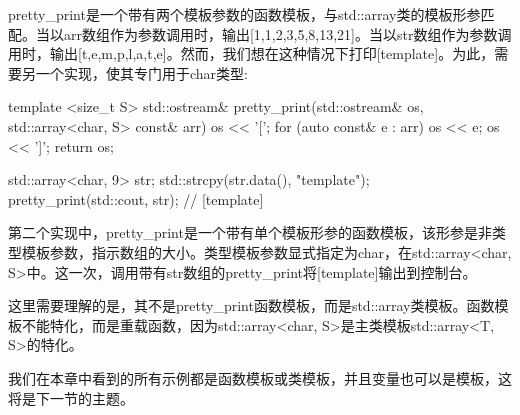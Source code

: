 pretty\_print是一个带有两个模板参数的函数模板，与std::array类的模板形参匹配。当以arr数组作为参数调用时，输出[1,1,2,3,5,8,13,21]。当以str数组作为参数调用时，输出[t,e,m,p,l,a,t,e]。然而，我们想在这种情况下打印[template]。为此，需要另一个实现，使其专门用于char类型:

\begin{cpp}
template <size_t S>
std::ostream& pretty_print(std::ostream& os,
						   std::array<char, S> const& arr)
{
	os << '[';
	for (auto const& e : arr)
		os << e;
	os << ']';
	return os;
}

std::array<char, 9> str;
std::strcpy(str.data(), "template");
pretty_print(std::cout, str); // [template]
\end{cpp}

第二个实现中，pretty\_print是一个带有单个模板形参的函数模板，该形参是非类型模板参数，指示数组的大小。类型模板参数显式指定为char，在std::array<char, S>中。这一次，调用带有str数组的pretty\_print将[template]输出到控制台。

这里需要理解的是，其不是pretty\_print函数模板，而是std::array类模板。函数模板不能特化，而是重载函数，因为std::array<char, S>是主类模板std::array<T, S>的特化。

我们在本章中看到的所有示例都是函数模板或类模板，并且变量也可以是模板，这将是下一节的主题。


